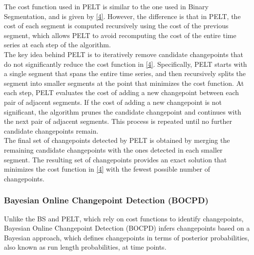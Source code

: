 \documentclass[]{interact}
\theoremstyle{plain}%
\theoremstyle{definition}
\theoremstyle{remark}
\begin{document}
	The cost function used in PELT is similar to the one used in Binary Segmentation, and is given by \autoref{4}. However, the difference is that in PELT, the cost of each segment is computed recursively using the cost of the previous segment, which allows PELT to avoid recomputing the cost of the entire time series at each step of the algorithm. \\
	
	The key idea behind PELT is to iteratively remove candidate changepoints that do not significantly reduce the cost function in \autoref{4}. Specifically, PELT starts with a single segment that spans the entire time series, and then recursively splits the segment into smaller segments at the point that minimizes the cost function\cite{chapmanMetaAnalysisMetricsChange}. At each step, PELT evaluates the cost of adding a new changepoint between each pair of adjacent segments. If the cost of adding a new changepoint is not significant, the algorithm prunes the candidate changepoint and continues with the next pair of adjacent segments. This process is repeated until no further candidate changepoints remain. \\
	
	The final set of changepoints detected by PELT is obtained by merging the remaining candidate changepoints with the ones detected in each smaller segment. The resulting set of changepoints provides an exact solution that minimizes the cost function in \autoref{4} with the fewest possible number of changepoints.
	
	\subsubsection{Bayesian Online Changepoint Detection (BOCPD)} \label{sec:BOCPD}
	
	
	\hspace{0.27cm} Unlike the BS and PELT, which rely on cost functions to identify changepoints, Bayesian Online Changepoint Detection (BOCPD) infers changepoints based on a Bayesian approach, which defines changepoints in terms of posterior probabilities, also known as run length probabilities, at time points. \\
	
\end{document}
